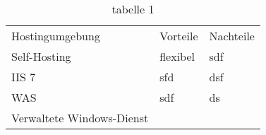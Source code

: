 \begin{table}[hb]
\begin{center}
\begin{tabular}{| l | p{5cm} | p{5cm} |}
\hline
Hostingumgebung &  Vorteile & Nachteile\\
Self-Hosting & flexibel & sdf \\
IIS 7 &sfd&dsf \\
WAS &sdf&ds \\
Verwaltete Windows-Dienst && \\
\hline
\end{tabular}
\caption{tabelle 1}
\label{tab1}
\end{center}
\end{table}